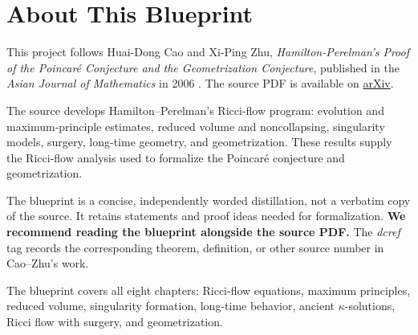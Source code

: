 

\chapter*{About This Blueprint}

This project follows Huai-Dong Cao and Xi-Ping Zhu,
\emph{Hamilton-Perelman's Proof of the Poincar\'e Conjecture and the
Geometrization Conjecture}, published in the \emph{Asian Journal of
Mathematics} in 2006 \cite{CaoZhu2006}. The source PDF is available on
\href{https://arxiv.org/pdf/math/0612069}{arXiv}.

The source develops Hamilton--Perelman's Ricci-flow program: evolution and
maximum-principle estimates, reduced volume and noncollapsing, singularity
models, surgery, long-time geometry, and geometrization. These results supply
the Ricci-flow analysis used to formalize the Poincar\'e conjecture and
geometrization.

The blueprint is a concise, independently worded distillation, not a verbatim
copy of the source. It retains statements and proof ideas needed for
formalization. \textbf{We recommend reading the blueprint alongside the
source PDF.} The \emph{dcref} tag records the corresponding theorem,
definition, or other source number in Cao--Zhu's work.

The blueprint covers all eight chapters: Ricci-flow equations, maximum
principles, reduced volume, singularity formation, long-time behavior,
ancient $\kappa$-solutions, Ricci flow with surgery, and geometrization.









